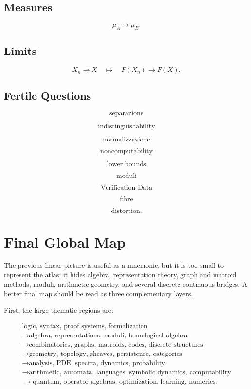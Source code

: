 \documentclass[11pt]{article}
\begin{document}
\subsection*{Measures}

\[
\mu_A\mapsto \mu_B.
\]

\subsection*{Limits}

\[
X_n\to X
\quad\mapsto\quad
F(X_n)\to F(X).
\]

\subsection*{Fertile Questions}

\[
\text{separazione}
\]

\[
\text{indistinguishability}
\]

\[
\text{normalizzazione}
\]

\[
\text{noncomputability}
\]

\[
\text{lower bounds}
\]

\[
\text{moduli}
\]

\[
\text{Verification Data}
\]

\[
\text{fibre}
\]

\[
\text{distortion}.
\]



\section{Final Global Map}

The previous linear picture is useful as a mnemonic, but it is too small to represent the atlas: it hides algebra, representation theory, graph and matroid methods, moduli, arithmetic geometry, and several discrete-continuous bridges. A better final map should be read as three complementary layers.

First, the large thematic regions are:

\[
\begin{gathered}
\text{logic, syntax, proof systems, formalization}\\
\to \text{algebra, representations, moduli, homological algebra}\\
\to \text{combinatorics, graphs, matroids, codes, discrete structures}\\
\to \text{geometry, topology, sheaves, persistence, categories}\\
\to \text{analysis, PDE, spectra, dynamics, probability}\\
\to \text{arithmetic, automata, languages, symbolic dynamics, computability}\\
\to \text{quantum, operator algebras, optimization, learning, numerics}.
\end{gathered}
\]
\end{document}
